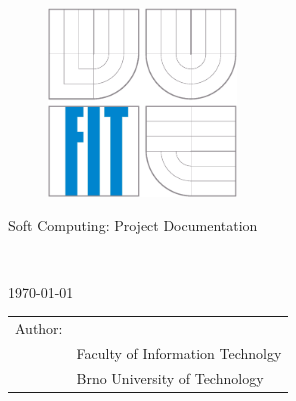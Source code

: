\begin{titlepage}

\begin{figure}[!h]
  \centering
  \includegraphics[height=5cm]{img/logo.eps}
\end{figure}

\vfill

\begin{center}
\begin{Large}
Soft Computing: Project Documentation \\
\end{Large}
\bigskip
\begin{Huge}
\projname\\
\end{Huge}
\end{center}

\vfill

\begin{center}
\begin{Large}
\today
\end{Large}
\end{center}

\vfill

\begin{flushleft}
\begin{large}
\begin{tabular}{ll}
Author: & \author, \url{\email} \\
 & Faculty of Information Technolgy \\
 & Brno University of Technology \\
\end{tabular}
\end{large}
\end{flushleft}
\end{titlepage}
